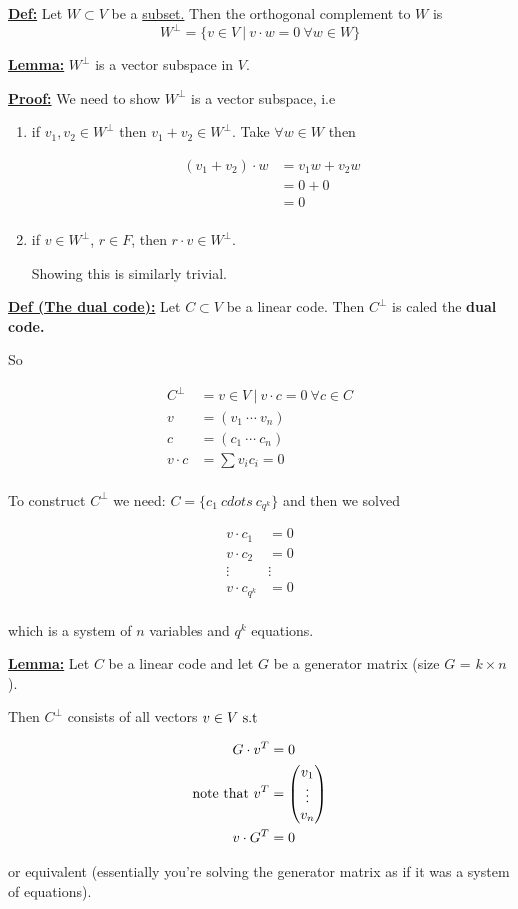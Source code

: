 \documentclass{article}
\renewcommand{\b}[1]{\textbf{#1}}
\newcommand{\ul}[1]{\underline{#1}}
\renewcommand{\aligned}[1]{
	\begin{align*}
		#1
	\end{align*}
}
\newcommand{\newdef}[2]{\b{\ul{#1:}} #2}
\newcommand{\st}{\textnormal{ s.t }}
\begin{document}
\newdef{Def}{
	Let $W \subset V$ be a \ul{subset.}
	Then the orthogonal complement to $W$ is
	\[W^\perp = \{ v \in V\ |\ v \cdot w = 0\ \forall w \in W\}\]
}

\newdef{Lemma}{
	$W^\perp$ is a vector subspace in $V$.
}

\newdef{Proof}{
	We need to show $W^\perp$ is a vector subspace, i.e
	\begin{enumerate}
		\item if $v_1, v_2 \in W^\perp$ then $v_1+v_2 \in W^\perp$.
		      Take $\forall w \in W$ then
		      \aligned {
			      (v_1+v_2) \cdot w & = v_1w + v_2w \\
			                        & = 0 + 0       \\
			                        & = 0           \\
		      }
		\item if $v\in W^\perp$, $r \in F$, then
		      $r \cdot v \in W^\perp$.

		      Showing this is similarly trivial.
	\end{enumerate}
}

\newdef{Def (The dual code)}{
	Let $C \subset V$ be a linear code. Then $C^\perp$ is caled the
	\textbf{dual code.}
}
So
\aligned{
C^\perp &= {v \in V\ |\ v \cdot c = 0\ \forall c \in C} \\
v &= (v_1\ \cdots\ v_n) \\
c &= (c_1\ \cdots\ c_n) \\
v \cdot c &= \sum v_ic_i = 0 \\
}
To construct $C^\perp$ we need: $C = \{c_1\ cdots\ c_{q^k}\}$
and then we solved

\aligned {
	v \cdot c_1     & = 0    \\
	v \cdot c_2     & = 0    \\
	\vdots          & \vdots \\
	v \cdot c_{q^k} & = 0    \\
}
which is a system of $n$ variables and $q^k$ equations.

\newdef{Lemma}{
	Let $C$ be a linear code and let $G$ be a generator matrix (size
	$G$ = $k \times n$).

	Then $C^\perp$ consists of all vectors $v \in V \st$
	\aligned {
		G \cdot v^T                & = 0                          \\
		\textnormal{note that }v^T & = \begin{pmatrix}
			v_1    \\
			\vdots \\
			v_n    \\
		\end{pmatrix} \\
		v \cdot G^T                & = 0
	}
	or equivalent (essentially you're solving the generator matrix as if it
	was a system of equations).
}
\end{document}
